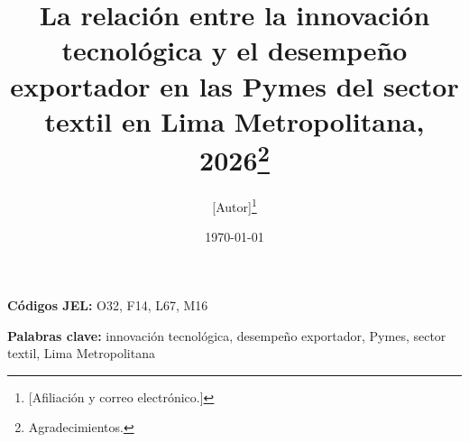 \documentclass[12pt]{article}
\title{La relación entre la innovación tecnológica y el desempeño exportador en las Pymes del sector textil en Lima Metropolitana, 2026\thanks{Agradecimientos.}}
\author{
[Autor]\thanks{[Afiliación y correo electrónico.]}
}
\date{\today}
\newcommand{\1}[1]{\mathds{1}\left[#1\right]}
\begin{document}
\maketitle
\thispagestyle{empty}

\begin{abstract}
\noindent {}
\end{abstract}

\vspace{1em}
\noindent \textbf{Códigos JEL:} O32, F14, L67, M16

\vspace{0.5em}
\noindent \textbf{Palabras clave:} innovación tecnológica, desempeño exportador, Pymes, sector textil, Lima Metropolitana

\newpage
\setcounter{page}{1}








\clearpage
\small \printbibliography
\end{document}
